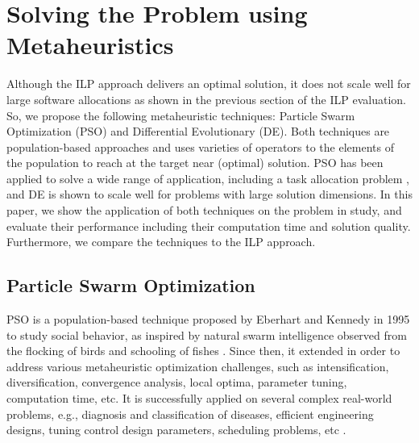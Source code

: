 \section{Solving the Problem using Metaheuristics}
Although the ILP approach delivers an optimal solution, it does not scale well for large software allocations as shown in the previous section of the ILP evaluation. So, we propose the following metaheuristic techniques: Particle Swarm Optimization (PSO) and Differential Evolutionary (DE). Both techniques are population-based approaches and uses varieties of operators to the elements of the population to reach at the target near (optimal) solution. PSO has been applied to solve a wide range of application, including a task allocation problem \cite{yin2007task}, and DE is shown to scale well for problems with large solution dimensions. In this paper, we show the application of both techniques on the problem in study, and evaluate their performance including their computation time and solution quality. Furthermore, we compare the techniques to the ILP approach.

\subsection{Particle Swarm Optimization}
PSO is a population-based technique proposed by Eberhart and Kennedy in 1995 to study social behavior, as inspired by natural swarm intelligence observed from the flocking of birds and schooling of fishes \cite{Kennedy1995ParticleOptimization}. Since then, it extended in order to address various metaheuristic optimization challenges, such as intensification, diversification, convergence analysis, local optima, parameter tuning, computation time, etc. It is successfully applied on several complex real-world problems, e.g., diagnosis and classification of diseases, efficient engineering designs, tuning control design parameters, scheduling problems, etc \cite{Poli2008AnApplications}. 

